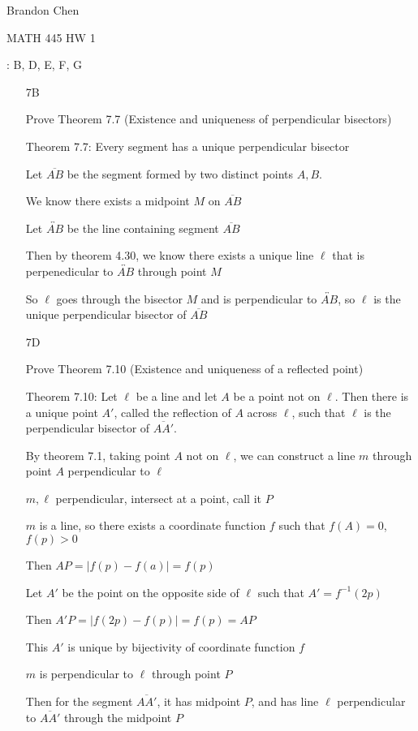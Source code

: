 \documentclass[11pt]{article}
\newcommand{\lines}[1]{\overleftrightarrow{#1}}
\newcommand{\segment}[1]{\overline{#1}}
\begin{document}
\noindent Brandon Chen

\noindent MATH 445 HW 1

: B, D, E, F, G

\begin{itemize}
\item[7B]

	Prove Theorem 7.7 (Existence and uniqueness of perpendicular bisectors)

	Theorem 7.7: Every segment has a unique perpendicular bisector

	Let $\segment{AB}$ be the segment formed by two distinct points $A,B$.

		We know there exists a midpoint $M$ on $\segment{AB}$

		Let $\lines{AB}$ be the line containing segment $\segment{AB}$

		Then by theorem 4.30, we know there exists a unique line $\ell$ that is perpenedicular to $\lines{AB}$ through point $M$

		So $\ell$ goes through the bisector $M$ and is perpendicular to $\lines{AB}$, so $\ell$ is the unique perpendicular bisector of $\segment{AB}$

\item[7D]

	Prove Theorem 7.10 (Existence and uniqueness of a reflected point)

	Theorem 7.10: Let $\ell$ be a line and let $A$ be a point not on $\ell$. Then there is a unique point $A'$, called the reflection of $A$ across $\ell$, such that $\ell$ is the perpendicular bisector of $\segment{AA'}$.

	By theorem 7.1, taking point $A$ not on $\ell$, we can construct a line $m$ through point $A$ perpendicular to $\ell$

	$m, \ell$ perpendicular, intersect at a point, call it $P$

		$m$ is a line, so there exists a coordinate function $f$ such that $f(A) = 0$, $f(p) > 0$

		Then $AP = |f(p) - f(a)| = f(p)$

		Let $A'$ be the point on the opposite side of $\ell$ such that $A' = f^{-1} (2p)$

		Then $A'P = |f(2p) - f(p)| = f(p) = AP$

		This $A'$ is unique by bijectivity of coordinate function $f$

		$m$ is perpendicular to $\ell$ through point $P$

		Then for the segment $\segment{AA'}$, it has midpoint $P$, and has line $\ell$ perpendicular to $\segment{AA'}$ through the midpoint $P$


\end{itemize}
\end{document}
